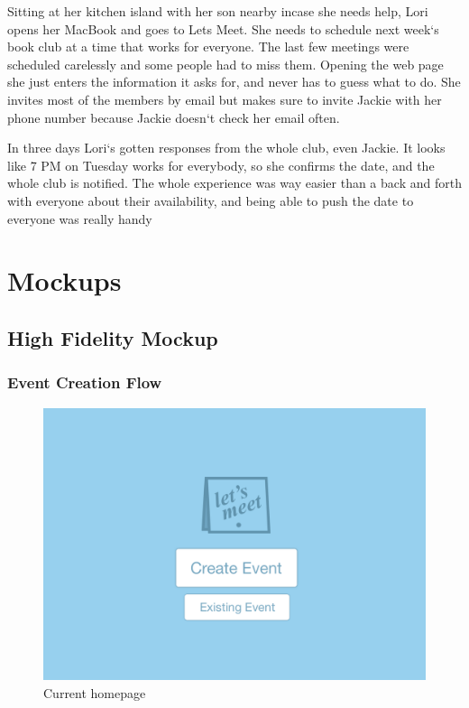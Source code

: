 \documentclass{sigchi}
\begin{document}
Sitting at her kitchen island with her son nearby incase she needs help, Lori opens her MacBook and goes to Lets Meet.
She needs to schedule next week`s book club at a time that works for everyone.
The last few meetings were scheduled carelessly and some people had to miss them.
Opening the web page she just enters the information it asks for, and never has to guess what to do.
She invites most of the members by email but makes sure to invite Jackie with her phone number because Jackie doesn`t check her email often.

In three days Lori`s gotten responses from the whole club, even Jackie.
It looks like 7 PM  on Tuesday works for everybody, so she confirms the date, and the whole club is notified.
The whole experience was way easier than a back and forth with everyone about their availability, and being able to push the date to everyone was really handy

\section{Mockups}
\subsection{High Fidelity Mockup}

\subsubsection{Event Creation Flow}
\begin{figure}
  \centering
  \includegraphics[width=1.75\columnwidth]{Mockup/Home}
  \caption{Current homepage}
\end{figure}
\end{document}

